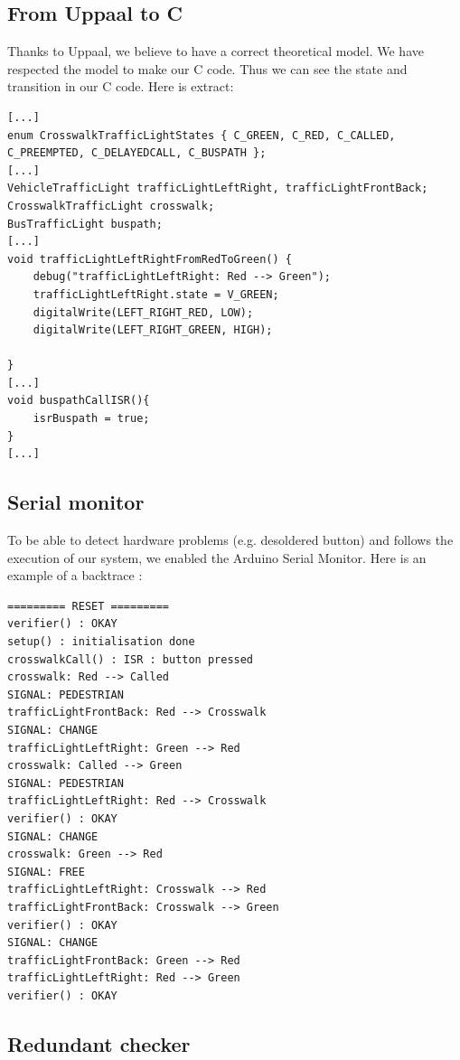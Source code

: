 \subsection{From Uppaal to C}

Thanks to Uppaal, we believe to have a correct theoretical model. We have respected the model to make our C code. Thus we can see the state and transition in our C code. Here is extract:

\begin{verbatim}
[...]
enum CrosswalkTrafficLightStates { C_GREEN, C_RED, C_CALLED, C_PREEMPTED, C_DELAYEDCALL, C_BUSPATH };
[...]
VehicleTrafficLight trafficLightLeftRight, trafficLightFrontBack;
CrosswalkTrafficLight crosswalk;
BusTrafficLight buspath;
[...]
void trafficLightLeftRightFromRedToGreen() {
    debug("trafficLightLeftRight: Red --> Green");
    trafficLightLeftRight.state = V_GREEN;
    digitalWrite(LEFT_RIGHT_RED, LOW);
    digitalWrite(LEFT_RIGHT_GREEN, HIGH);

}
[...]
void buspathCallISR(){
    isrBuspath = true;
}
[...]
\end{verbatim}


\subsection{Serial monitor}

To be able to detect hardware problems (e.g. desoldered button) and follows the execution of our system, we enabled the Arduino Serial Monitor. Here is an example of a backtrace :

\begin{verbatim}
========= RESET =========
verifier() : OKAY
setup() : initialisation done
crosswalkCall() : ISR : button pressed
crosswalk: Red --> Called
SIGNAL: PEDESTRIAN
trafficLightFrontBack: Red --> Crosswalk
SIGNAL: CHANGE
trafficLightLeftRight: Green --> Red
crosswalk: Called --> Green
SIGNAL: PEDESTRIAN
trafficLightLeftRight: Red --> Crosswalk
verifier() : OKAY
SIGNAL: CHANGE
crosswalk: Green --> Red
SIGNAL: FREE
trafficLightLeftRight: Crosswalk --> Red
trafficLightFrontBack: Crosswalk --> Green
verifier() : OKAY
SIGNAL: CHANGE
trafficLightFrontBack: Green --> Red
trafficLightLeftRight: Red --> Green
verifier() : OKAY
\end{verbatim}

\subsection{Redundant checker}

